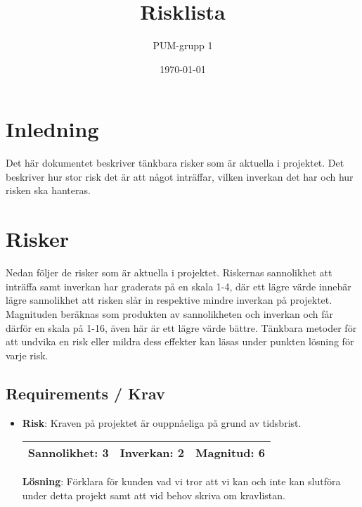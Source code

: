 

\ifpdf
\else
\fi

\title{Risklista}
\author{PUM-grupp 1}
\date{\today}



\maketitle\thispagestyle{empty}

\newpage

\setcounter{tocdepth}{2}
\newpage

\section{Inledning}
Det här dokumentet beskriver tänkbara risker som är aktuella i projektet. Det beskriver hur stor risk det är att något inträffar, vilken inverkan det har och hur risken ska hanteras.

\section{Risker}
Nedan följer de risker som är aktuella i projektet. Riskernas sannolikhet att inträffa samt inverkan har graderats på en skala 1-4, där ett lägre värde innebär lägre sannolikhet att risken slår in respektive mindre inverkan på projektet. Magnituden beräknas som produkten av sannolikheten och inverkan och får därför en skala på 1-16, även här är ett lägre värde bättre. Tänkbara metoder för att undvika en risk eller mildra dess effekter kan läsas under punkten lösning för varje risk.

\subsection{Requirements / Krav}
\begin{itemize}
\item \textbf{Risk}: Kraven på projektet är ouppnåeliga på grund av tidsbrist.

\begin{tabular}{ | l | l | l |}
	\hline
	Sannolikhet: 3 & Inverkan: 2 & Magnitud: 6 \\ \hline
\end{tabular}

\textbf{Lösning}: Förklara för kunden vad vi tror att vi kan och inte kan slutföra under detta projekt samt att vid behov skriva om kravlistan.
\end{itemize}

